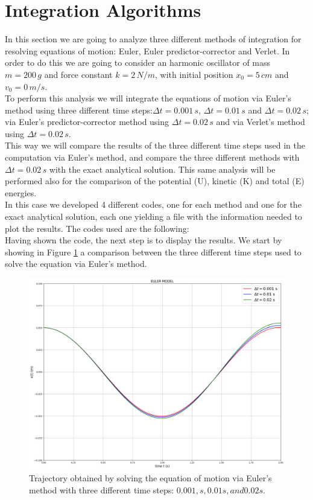 \documentclass{article}
\begin{document}
\section{Integration Algorithms}
In this section we are going to analyze  three different methods of integration for resolving equations of motion: Euler, Euler predictor-corrector and Verlet. In order to do this we are going to consider an harmonic oscillator of mass $m=200 \, g$ and force constant $k=2 \,N/m$, with initial position $x_0=5 \, cm$ and $v_0=0 \, m/s$.\\
To perform this analysis we will integrate the equations of motion via Euler's method using three different time steps:$\Delta t=0.001 \,s$, $\Delta t=0.01 \,s$ and $\Delta t=0.02 \,s$; via Euler's predictor-corrector method using $\Delta t=0.02 \,s$ and via Verlet's method using $\Delta t=0.02 \,s$.\\
This way we will compare the results of the three different time steps used in the computation via Euler's method, and compare the three different methods with $\Delta t=0.02 \,s$ with the exact analytical solution. This same analysis will be performed also for the comparison of the potential (U), kinetic (K) and total (E) energies.\\
In this case we developed 4 different codes, one for each
method and one for the exact analytical solution, each one yielding a file with the information needed to plot the results. The codes used are the following:\\
Having shown the code, the next step is to display the results. We start by showing in Figure \ref{fig:Euler_method} a comparison between the three different time steps used to solve the equation via Euler's method.\\
\begin{figure}[h!]
 \centering
  \includegraphics[width=0.7\linewidth]{Euler_eq_motion.png}
  \caption{Trajectory obtained by solving the equation of motion via Euler's method with three different time steps: $0.001 , s, 0.01 s, and 0.02 s$.}
  \label{fig:Euler_method}
\end{figure}
\end{document}
